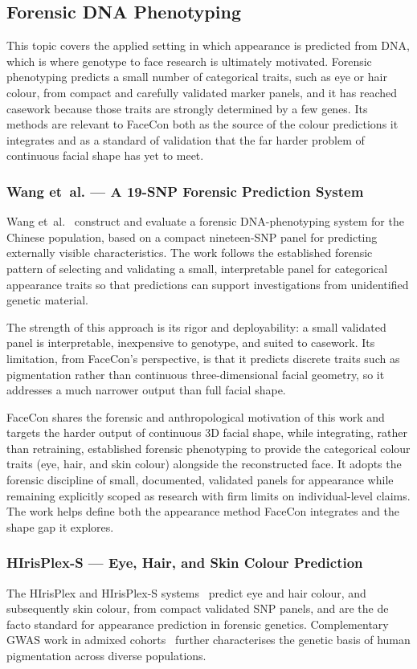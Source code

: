 \subsection{Forensic DNA Phenotyping}
This topic covers the applied setting in which appearance is predicted from DNA, which is where genotype to face research is ultimately motivated. Forensic phenotyping predicts a small number of categorical traits, such as eye or hair colour, from compact and carefully validated marker panels, and it has reached casework because those traits are strongly determined by a few genes. Its methods are relevant to FaceCon both as the source of the colour predictions it integrates and as a standard of validation that the far harder problem of continuous facial shape has yet to meet.

\subsubsection{Wang et~al. --- A 19-SNP Forensic Prediction System}
Wang et~al.~\cite{ref:wang} construct and evaluate a forensic DNA-phenotyping system for the Chinese population, based on a compact nineteen-SNP panel for predicting externally visible characteristics. The work follows the established forensic pattern of selecting and validating a small, interpretable panel for categorical appearance traits so that predictions can support investigations from unidentified genetic material.

The strength of this approach is its rigor and deployability: a small validated panel is interpretable, inexpensive to genotype, and suited to casework. Its limitation, from FaceCon's perspective, is that it predicts discrete traits such as pigmentation rather than continuous three-dimensional facial geometry, so it addresses a much narrower output than full facial shape.

FaceCon shares the forensic and anthropological motivation of this work and targets the harder output of continuous 3D facial shape, while integrating, rather than retraining, established forensic phenotyping to provide the categorical colour traits (eye, hair, and skin colour) alongside the reconstructed face. It adopts the forensic discipline of small, documented, validated panels for appearance while remaining explicitly scoped as research with firm limits on individual-level claims. The work helps define both the appearance method FaceCon integrates and the shape gap it explores.

\subsubsection{HIrisPlex-S --- Eye, Hair, and Skin Colour Prediction}
The HIrisPlex and HIrisPlex-S systems~\cite{ref:hirisplex,ref:hirisplexs} predict eye and hair colour, and subsequently skin colour, from compact validated SNP panels, and are the de facto standard for appearance prediction in forensic genetics. Complementary GWAS work in admixed cohorts~\cite{ref:adhikari} further characterises the genetic basis of human pigmentation across diverse populations.

